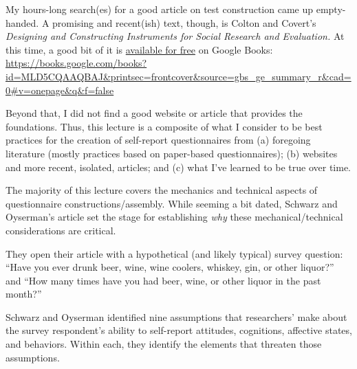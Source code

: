 \documentclass[
  english,
]{book}
\begin{document}
My hours-long search(es) for a good article on test construction came up empty-handed. A promising and recent(ish) text, though, is Colton and Covert's \citeyearpar{colton_designing_2015} \emph{Designing and Constructing Instruments for Social Research and Evaluation.} At this time, a good bit of it is \href{https://books.google.com/books?id=MLD5CQAAQBAJ\&printsec=frontcover\&source=gbs_ge_summary_r\&cad=0\#v=onepage\&q\&f=false}{available for free} on Google Books: \url{https://books.google.com/books?id=MLD5CQAAQBAJ\&printsec=frontcover\&source=gbs_ge_summary_r\&cad=0\#v=onepage\&q\&f=false}

Beyond that, I did not find a good website or article that provides the foundations. Thus, this lecture is a composite of what I consider to be best practices for the creation of self-report questionnaires from (a) foregoing literature (mostly practices based on paper-based questionnaires); (b) websites and more recent, isolated, articles; and (c) what I've learned to be true over time.

The majority of this lecture covers the mechanics and technical aspects of questionnaire constructions/assembly. While seeming a bit dated, Schwarz and Oyserman's \citeyearpar{schwarz_asking_2001} article set the stage for establishing \emph{why} these mechanical/technical considerations are critical.

They open their article with a hypothetical (and likely typical) survey question: ``Have you ever drunk beer, wine, wine coolers, whiskey, gin, or other liquor?'' and ``How many times have you had beer, wine, or other liquor in the past month?''

Schwarz and Oyserman identified nine assumptions that researchers' make about the survey respondent's ability to self-report attitudes, cognitions, affective states, and behaviors. Within each, they identify the elements that threaten those assumptions.
\end{document}
